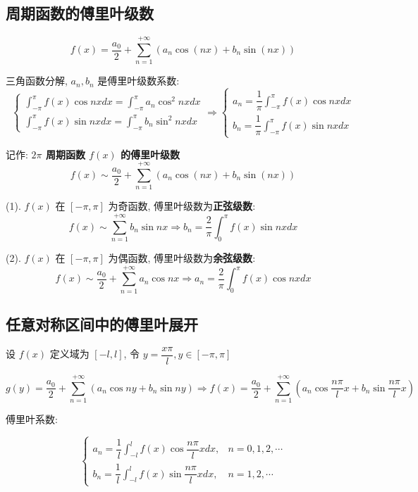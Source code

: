 \subsection{周期函数的傅里叶级数}
\begin{theorem}
	$$f(x) = \dfrac{a_{0}}{2} + \sum\limits_{n=1}^{+\infty}(a_{n}\cos (nx)+b_{n}\sin (nx))$$

	三角函数分解, $a_{n}, b_{n}$ 是傅里叶级数系数:
	$$\begin{cases}
	  \displaystyle{\int_{-\pi}^{\pi}f(x)\cos nx dx = \int_{-\pi}^{\pi}a_{n}\cos^{2} nxdx} \\
	  \displaystyle{\int_{-\pi}^{\pi}f(x)\sin nx dx = \int_{-\pi}^{\pi}b_{n}\sin^{2} nxdx}
	\end{cases}\Rightarrow 
	\begin{cases}
	  \displaystyle{a_{n} = \dfrac{1}{\pi}\int_{-\pi}^{\pi}f(x)\cos nxdx} \\
	  \displaystyle{b_{n} = \dfrac{1}{\pi}\int_{-\pi}^{\pi}f(x)\sin nxdx}
	\end{cases}$$

	记作: \textbf{$2\pi$ 周期函数 $f(x)$ 的傅里叶级数}
	 $$f(x) \sim\dfrac{a_{0}}{2} + \sum\limits_{n=1}^{+\infty}(a_{n}\cos (nx)+b_{n}\sin (nx))$$
\end{theorem}

\begin{theorem}
	
	(1). $f(x)$ 在 $[-\pi,\pi]$ 为奇函数, 傅里叶级数为\textbf{正弦级数}:
	$$f(x) \sim \sum\limits_{n=1}^{+\infty}b_{n}\sin nx\Rightarrow b_{n} = \dfrac{2}{\pi}\int_{0}^{\pi}f(x)\sin nxdx$$

	(2). $f(x)$ 在 $[-\pi,\pi]$ 为偶函数, 傅里叶级数为\textbf{余弦级数}:
	$$f(x) \sim \dfrac{a_{0}}{2} + \sum\limits_{n=1}^{+\infty}a_{n}\cos nx\Rightarrow a_{n} = \dfrac{2}{\pi}\int_{0}^{\pi}f(x)\cos nxdx$$
\end{theorem}

\subsection{任意对称区间中的傅里叶展开}

\begin{definition}[任意对称区间中的傅里叶展开]
	设 $f(x)$ 定义域为 $[-l,l]$, 令 $y = \dfrac{x\pi}{l},y\in[-\pi,\pi]$

	$$g(y) = \dfrac{a_{0}}{2} + \sum\limits_{n=1}^{+\infty}(a_{n}\cos ny+b_{n}\sin ny)\Rightarrow 
	f(x) = \frac{a_{0}}{2}+\sum\limits_{n=1}^{+\infty}(a_{n}\cos \dfrac{n\pi}{l}x+b_{n}\sin \dfrac{n\pi}{l}x)$$
	
	傅里叶系数:
	
	$$\begin{cases}
		\displaystyle{a_{n}=\dfrac{1}{l}\int_{-l}^{l}f(x)\cos \dfrac{n\pi}{l}xdx}, &n=0,1,2,\cdots \\
		\displaystyle{b_{n}=\dfrac{1}{l}\int_{-l}^{l}f(x)\sin \dfrac{n\pi}{l}xdx}, &n=1,2,\cdots
	\end{cases}$$
\end{definition}

